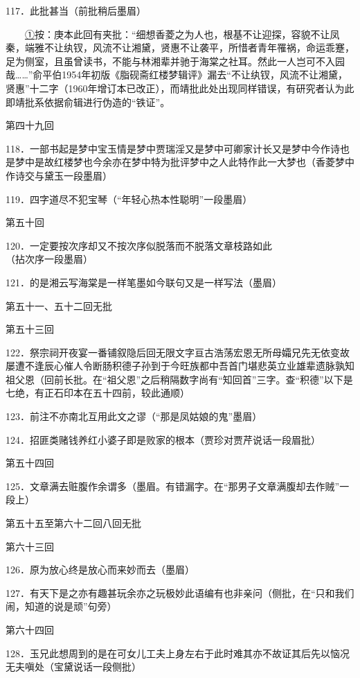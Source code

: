 117．此批甚当{（\kaishu 前批稍后墨眉）}

{　　\href{../Text/part0087.html\#navto_1_a}{①}按：庚本此回有夹批：``细想香菱之为人也，根基不让迎探，容貌不让凤秦，端雅不让纨钗，风流不让湘黛，贤惠不让袭平，所惜者青年罹祸，命运乖蹇，足为侧室，且虽曾读书，不能与林湘辈并驰于海棠之社耳。然此一人岂可不入园哉\ldots{}\ldots{}''俞平伯1954年初版《脂砚斋红楼梦辑评》漏去``不让纨钗，风流不让湘黛，贤惠''十二字（1960年增订本已改正），而靖批此处出现同样错误，有研究者认为此即靖批系依据俞辑进行伪造的``铁证''。}

\href{../Text/part0087.html\#navto_t_a}{}

第四十九回

118．一部书起是梦中宝玉情是梦中贾瑞淫又是梦中可卿家计长又是梦中今作诗也是梦中是故红楼梦也今余亦在梦中特为批评梦中之人此特作此一大梦也{（\kaishu 香菱梦中作诗交与黛玉一段墨眉）}

119．四字道尽不犯宝琴{（\kaishu ``年轻心热本性聪明''一段墨眉）}

第五十回

120．一定要按次序却又不按次序似脱落而不脱落文章枝路如此{（\kaishu 拈次序一段墨眉）}

121．的是湘云写海棠是一样笔墨如今联句又是一样写法{（\kaishu 墨眉）}

第五十一、五十二回无批

第五十三回

122．祭宗祠开夜宴一番铺叙隐后回无限文字亘古浩荡宏恩无所母孀兄先无依变故屡遭不逢辰心催人令断肠积德子孙到于今旺族都中吾首门堪悲英立业雄辈遗脉孰知祖父恩{（\kaishu 回前长批。在``祖父恩''之后稍隔数字尚有``知回首''三字。查``积德''以下是七绝，有正石印本在五十四前，较此通顺）}

123．前注不亦南北互用此文之谬{（\kaishu ``那是凤姑娘的鬼''墨眉）}

124．招匪类赌钱养红小婆子即是败家的根本{（\kaishu 贾珍对贾芹说话一段眉批）}

第五十四回

125．文章满去赃腹作余谓多{（\kaishu 墨眉。有错漏字。在``那男子文章满腹却去作贼''一段上）}

第五十五至第六十二回八回无批

第六十三回

126．原为放心终是放心而来妙而去{（\kaishu 墨眉）}

127．有天下是之亦有趣甚玩余亦之玩极妙此语编有也非亲问{（\kaishu 侧批，在``只和我们闹，知道的说是顽''句旁）}

第六十四回

128．玉兄此想周到的是在可女儿工夫上身左右于此时难其亦不故证其后先以恼况无夫嗔处{（\kaishu 宝黛说话一段侧批）}

